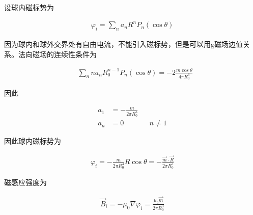 \documentclass{article}
\begin{document}
设球内磁标势为

\begin{equation*}
  \begin{aligned}
    \varphi_i = \sum_n a_{n} R^{n} P_n \left( \cos \theta \right)
  \end{aligned}
\end{equation*}

因为球内和球外交界处有自由电流，不能引入磁标势，但是可以用g磁场边值关系。法向磁场的连续性条件为

\begin{equation*}
  \begin{aligned}
    & \sum_n n a_{n} R_0^{n-1} P_n \left( \cos \theta \right) = - 2 \frac{m \cos \theta}{4\pi R_0^{3}}
  \end{aligned}
\end{equation*}

因此

\begin{equation*}
  \begin{aligned}
    a_1 &= - \frac{m}{2\pi R_0^3} \\
    a_n &= 0 && n \neq 1
  \end{aligned}
\end{equation*}

因此球内磁标势为

\begin{equation*}
  \begin{aligned}
    \varphi_i = - \frac{m}{2\pi R_0^3} R \cos \theta = - \frac{\vec{m} \cdot \vec{R}}{2\pi R_{0}^{3}}
  \end{aligned}
\end{equation*}

磁感应强度为

\begin{equation*}
  \begin{aligned}
    \vec{B}_i = - \mu_0 \nabla \varphi_i = \frac{\mu_0 \vec{m}}{2\pi R_{0}^{3}}
  \end{aligned}
\end{equation*}
\end{document}
